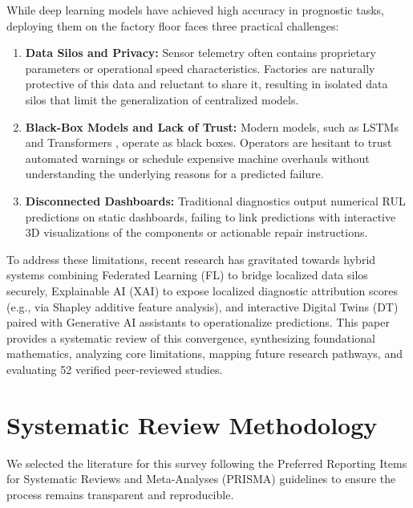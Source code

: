 \documentclass[journal,10pt,compsoc]{IEEEtran}
\begin{document}
While deep learning models have achieved high accuracy in prognostic tasks, deploying them on the factory floor faces three practical challenges:
\begin{enumerate}
    \item \textbf{Data Silos and Privacy:} Sensor telemetry often contains proprietary parameters or operational speed characteristics. Factories are naturally protective of this data and reluctant to share it, resulting in isolated data silos that limit the generalization of centralized models.
    \item \textbf{Black-Box Models and Lack of Trust:} Modern models, such as LSTMs \cite{hochreiter_lstm} and Transformers \cite{vaswani_attention}, operate as black boxes. Operators are hesitant to trust automated warnings or schedule expensive machine overhauls without understanding the underlying reasons for a predicted failure.
    \item \textbf{Disconnected Dashboards:} Traditional diagnostics output numerical RUL predictions on static dashboards, failing to link predictions with interactive 3D visualizations of the components or actionable repair instructions.
\end{enumerate}

To address these limitations, recent research has gravitated towards hybrid systems combining Federated Learning (FL) to bridge localized data silos securely, Explainable AI (XAI) to expose localized diagnostic attribution scores (e.g., via Shapley additive feature analysis), and interactive Digital Twins (DT) paired with Generative AI assistants to operationalize predictions. This paper provides a systematic review of this convergence, synthesizing foundational mathematics, analyzing core limitations, mapping future research pathways, and evaluating 52 verified peer-reviewed studies.

\section{Systematic Review Methodology}
\label{sec:methodology}
We selected the literature for this survey following the Preferred Reporting Items for Systematic Reviews and Meta-Analyses (PRISMA) guidelines to ensure the process remains transparent and reproducible.
\end{document}

